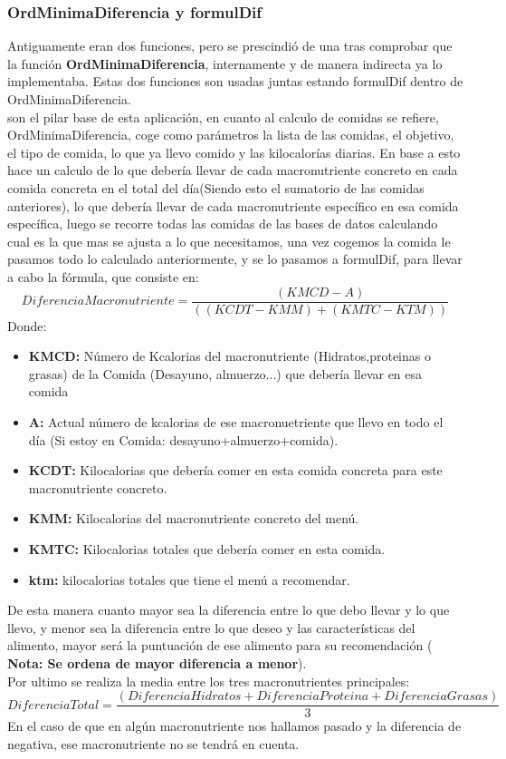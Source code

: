 \subsubsection{OrdMinimaDiferencia y  formulDif}
Antiguamente eran dos funciones, pero se prescindió de una tras comprobar que la función \textbf{OrdMinimaDiferencia}, internamente y de manera indirecta ya lo implementaba. Estas dos funciones son usadas juntas estando formulDif dentro de OrdMinimaDiferencia.\\

son el pilar base de esta aplicación, en cuanto al calculo de comidas se refiere, OrdMinimaDiferencia, coge como parámetros la lista de las comidas, el objetivo, el tipo de comida, lo que ya llevo comido y las kilocalorías diarias. En base a esto hace un calculo de lo que debería llevar de cada macronutriente concreto en cada comida concreta en el total del día(Siendo esto el sumatorio de las comidas anteriores), lo que debería llevar de cada macronutriente específico en esa comida específica, luego se recorre todas las comidas de las bases de datos calculando cual es la que mas se ajusta a lo que necesitamos, una vez cogemos la comida le pasamos todo lo calculado anteriormente, y se lo pasamos a formulDif, para llevar a cabo la fórmula, que consiste en:
\begin{equation}
DiferenciaMacronutriente = \frac{(KMCD - A)}{((KCDT-KMM)+(KMTC-KTM))}
\end{equation}
Donde:
\begin{itemize}
\item \textbf{KMCD:} Número de Kcalorias del macronutriente (Hidratos,proteinas o grasas) de la Comida (Desayuno, almuerzo...) que debería llevar en esa comida
\item \textbf{A:} Actual número de kcalorias de ese macronuetriente que llevo en todo el día (Si estoy en Comida: desayuno+almuerzo+comida).
\item \textbf{KCDT:} Kilocalorias que debería comer en esta comida concreta para este macronutriente concreto.
\item \textbf{KMM:} Kilocalorias del macronutriente concreto del menú.
\item \textbf{KMTC:} Kilocalorias totales que debería comer en esta comida.
\item \textbf{ktm:} kilocalorias totales que tiene el menú a recomendar.

\end{itemize}

De esta manera cuanto mayor sea la diferencia entre lo que debo llevar y lo que llevo, y menor sea la diferencia entre lo que deseo y las características del alimento, mayor será la puntuación de ese alimento para su recomendación ( \textbf{Nota: Se ordena de mayor diferencia a menor}).\\
Por ultimo se realiza la media entre los tres macronutrientes principales:
\begin{equation}
DiferenciaTotal = \frac{(DiferenciaHidratos+DiferenciaProteina+DiferenciaGrasas)}{3}
\end{equation} 
En el caso de que en algún macronutriente nos hallamos pasado y la diferencia de negativa, ese macronutriente no se tendrá en cuenta.
